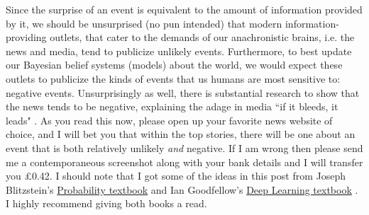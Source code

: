 \documentclass{article}
\begin{document}
Since the surprise of an event is equivalent to the amount of information provided by it, we should be unsurprised (no pun intended) that modern information-providing outlets, that cater to the demands of our anachronistic brains, i.e. the news and media, tend to publicize unlikely events. Furthermore, to best update our Bayesian belief systems (models) about the world, we would expect these outlets to publicize the kinds of events that us humans are most sensitive to: negative events. Unsurprisingly as well, there is substantial research to show that the news tends to be negative, explaining the adage in media ``if it bleeds, it leads" \cite{Soroka2019}. As you read this now, please open up your favorite news website of choice, and I will bet you that within the top stories, there will be one about an event that is both relatively unlikely \emph{and} negative. If I am wrong then please send me a contemporaneous screenshot along with your bank details and I will transfer you £0.42. I should note that I got some of the ideas in this post from Joseph Blitzstein's \href{https://drive.google.com/file/d/1VmkAAGOYCTORq1wxSQqy255qLJjTNvBI/view}{Probability textbook} \cite{Blitzstein2014} and Ian Goodfellow's \href{https://www.deeplearningbook.org/}{Deep Learning textbook} \cite{Goodfellow2016}. I highly recommend giving both books a read.

\newpage



\end{document}
